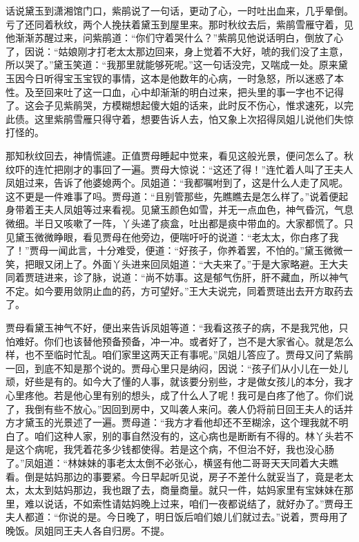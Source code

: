 


\begin{parag}
    话说黛玉到潇湘馆门口，紫鹃说了一句话，更动了心，一时吐出血来，几乎晕倒。亏了还同着秋纹，两个人挽扶着黛玉到屋里来。那时秋纹去后，紫鹃雪雁守着，见他渐渐苏醒过来，问紫鹃道：“你们守着哭什么？”紫鹃见他说话明白，倒放了心了，因说：“姑娘刚才打老太太那边回来，身上觉着不大好，唬的我们没了主意，所以哭了。”黛玉笑道：“我那里就能够死呢。”这一句话没完，又喘成一处。原来黛玉因今日听得宝玉宝钗的事情，这本是他数年的心病，一时急怒，所以迷惑了本性。及至回来吐了这一口血，心中却渐渐的明白过来，把头里的事一字也不记得了。这会子见紫鹃哭，方模糊想起傻大姐的话来，此时反不伤心，惟求速死，以完此债。这里紫鹃雪雁只得守着，想要告诉人去，怕又象上次招得凤姐儿说他们失惊打怪的。
\end{parag}


\begin{parag}
    那知秋纹回去，神情慌遽。正值贾母睡起中觉来，看见这般光景，便问怎么了。秋纹吓的连忙把刚才的事回了一遍。贾母大惊说：“这还了得！”连忙着人叫了王夫人凤姐过来，告诉了他婆媳两个。凤姐道：“我都嘱咐到了，这是什么人走了风呢。这不更是一件难事了吗。贾母道：“且别管那些，先瞧瞧去是怎么样了。”说着便起身带着王夫人凤姐等过来看视。见黛玉颜色如雪，并无一点血色，神气昏沉，气息微细。半日又咳嗽了一阵，丫头递了痰盒，吐出都是痰中带血的。大家都慌了。只见黛玉微微睁眼，看见贾母在他旁边，便喘吁吁的说道：“老太太，你白疼了我了！”贾母一闻此言，十分难受，便道：“好孩子，你养着罢，不怕的。”黛玉微微一笑，把眼又闭上了。外面丫头进来回凤姐道：“大夫来了。”于是大家略避。王大夫同着贾琏进来，诊了脉，说道：“尚不妨事。这是郁气伤肝，肝不藏血，所以神气不定。如今要用敛阴止血的药，方可望好。”王大夫说完，同着贾琏出去开方取药去了。
\end{parag}


\begin{parag}
    贾母看黛玉神气不好，便出来告诉凤姐等道：“我看这孩子的病，不是我咒他，只怕难好。你们也该替他预备预备，冲一冲。或者好了，岂不是大家省心。就是怎么样，也不至临时忙乱。咱们家里这两天正有事呢。”凤姐儿答应了。贾母又问了紫鹃一回，到底不知是那个说的。贾母心里只是纳闷，因说：“孩子们从小儿在一处儿顽，好些是有的。如今大了懂的人事，就该要分别些，才是做女孩儿的本分，我才心里疼他。若是他心里有别的想头，成了什么人了呢！我可是白疼了他了。你们说了，我倒有些不放心。”因回到房中，又叫袭人来问。袭人仍将前日回王夫人的话并方才黛玉的光景述了一遍。贾母道：“我方才看他却还不至糊涂，这个理我就不明白了。咱们这种人家，别的事自然没有的，这心病也是断断有不得的。林丫头若不是这个病呢，我凭着花多少钱都使得。若是这个病，不但治不好，我也没心肠了。”凤姐道：“林妹妹的事老太太倒不必张心，横竖有他二哥哥天天同着大夫瞧看。倒是姑妈那边的事要紧。今日早起听见说，房子不差什么就妥当了，竟是老太太，太太到姑妈那边，我也跟了去，商量商量。就只一件，姑妈家里有宝妹妹在那里，难以说话，不如索性请姑妈晚上过来，咱们一夜都说结了，就好办了。”贾母王夫人都道：“你说的是。今日晚了，明日饭后咱们娘儿们就过去。”说着，贾母用了晚饭。凤姐同王夫人各自归房。不提。
\end{parag}


